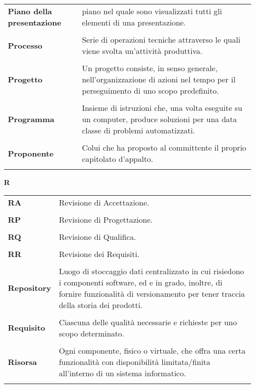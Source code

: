 {\begin{longtable}{L{4cm} p{10cm}}
 \\ 
\textbf{Piano della presentazione} & piano nel quale sono visualizzati tutti gli elementi di una presentazione. \\ 
 \\ 
\textbf{Processo} & Serie di operazioni tecniche attraverso le quali viene svolta un'attività produttiva. \\ 
 \\ 
\textbf{Progetto} & Un progetto consiste, in senso generale, nell'organizzazione di azioni nel tempo per il perseguimento di uno scopo predefinito. \\ 
 \\ 
\textbf{Programma} & Insieme di istruzioni che, una volta eseguite su un computer, produce soluzioni per una data classe di problemi automatizzati. \\ 
 \\ 
\textbf{Proponente} & Colui che ha proposto al committente il proprio capitolato d’appalto. \\ 
 \\ 
\end{longtable} 
\newpage 
{} 
{} 
\hfill\Huge{\textbf{R}} \\ 
\normalsize 
\begin{longtable}{L{4cm} p{10cm}}
\textbf{RA} & Revisione di Accettazione. \\ 
 \\ 
\textbf{RP} & Revisione di Progettazione. \\ 
 \\ 
\textbf{RQ} & Revisione di Qualifica. \\ 
 \\ 
\textbf{RR} & Revisione dei Requisiti. \\ 
 \\ 
\textbf{Repository} & Luogo di stoccaggio dati centralizzato in cui risiedono i componenti software, ed e in grado, inoltre, di fornire funzionalità di versionamento per tener traccia della storia dei prodotti. \\ 
 \\ 
\textbf{Requisito} & Ciascuna delle qualità necessarie e richieste per uno scopo determinato. \\ 
 \\ 
\textbf{Risorsa} & Ogni componente, fisico o virtuale, che offra una certa funzionalità con disponibilità limitata/finita all'interno di un sistema informatico. \\ 
 \\ 

\end{longtable}}
